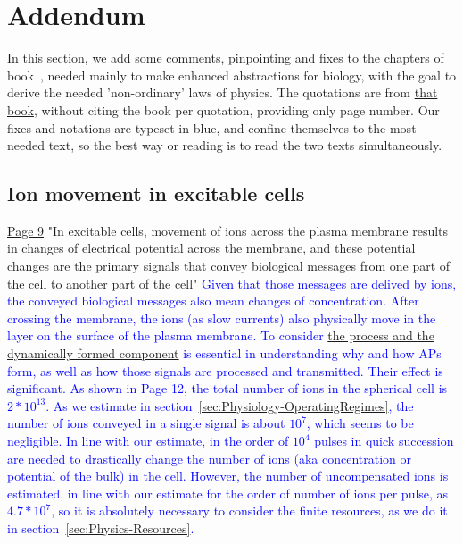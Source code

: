 
\section{Addendum\label{sec:Physics-Addendum}}

In this section, we add some comments, pinpointing and fixes to the chapters of book~\cite{JohnstonWuNeurophysiology:1995}, needed mainly to make 
enhanced abstractions for biology, with the goal to derive the needed 'non-ordinary' laws of physics.
The quotations are from \href{https://rcweb.dartmouth.edu/~mvdm/wiki/lib/exe/fetch.php?media=analysis:johnstonwu.pdf}{that book},
without citing the book per quotation, providing only page number. Our fixes and notations are
typeset in blue, and confine themselves to the most needed text,
so the best way or reading is to read the two texts simultaneously.

\subsection{Ion movement in excitable cells\label{sec:Physics-IonMovement}}
\href{https://rcweb.dartmouth.edu/~mvdm/wiki/lib/exe/fetch.php?media=analysis:johnstonwu.pdf}{Page 9} "In excitable cells, movement of
ions across the plasma membrane results in changes of electrical potential
across the membrane, and these potential changes are the primary signals
that convey biological messages from one part of the cell to another part
of the cell" \textcolor{blue}{Given that those messages are delived by ions, the conveyed biological messages also mean changes of concentration. After crossing the membrane,
the ions (as slow currents) also physically move in the layer on the surface of 
the plasma membrane. To consider \hyperlink{atomic_layer}
{the process and the dynamically formed component} is essential in understanding why and how
APs form, as well as how those signals are processed and transmitted. Their effect is significant. As shown in Page 12, the total number of ions in the spherical cell is $2*10^{13}$. As we estimate in section~\ref{sec:Physiology-OperatingRegimes}, the number of ions conveyed in a single signal is about $10^{7}$, which seems to be negligible. In line with our estimate, in the order of $10^4$ pulses in quick succession are needed to drastically change the number of ions (aka concentration or potential of the bulk) in the cell. However, the 
number of uncompensated ions is estimated, in line with our estimate for the order of number of ions per pulse,  as $4.7*10^7$, so it is absolutely necessary to consider
the finite resources, as we do it in section~\ref{sec:Physics-Resources}.}

